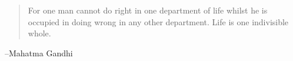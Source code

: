 \documentclass[letterpaper, landscape]{exam}
\begin{document}
  \else
    \vspace{12 cm}
    \begin{quote}
      \begin{em}
        For one man cannot do right in one department of life whilst he is
        occupied in doing wrong in any other department. Life is one indivisible
        whole.
      \end{em}
    \end{quote}
    \hspace{1 cm} --Mahatma Gandhi
  \fi
\end{document}

